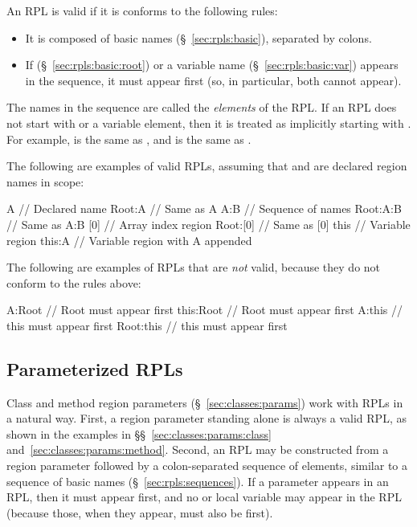 An RPL is valid if it is conforms to the following rules:
%
\begin{itemize}
%
\item It is composed of basic names (\S~\ref{sec:rpls:basic}),
  separated by colons.
%
\item If  (\S~\ref{sec:rpls:basic:root}) or a variable name
  (\S~\ref{sec:rpls:basic:var}) appears in the sequence, it must
  appear first (so, in particular, both cannot appear).
%
\end{itemize}
%
The names in the sequence are called the \emph{elements} of the RPL.
If an RPL does not start with  or a variable element, then
it is treated as implicitly starting with .  For example,
 is the same as , and \kwd{[0]} is the same as
.

The following are examples of valid RPLs, assuming that  and
 are declared region names in scope:
%
\begin{dpjlisting}
A        // Declared name
Root:A   // Same as A
A:B      // Sequence of names
Root:A:B // Same as A:B
[0]      // Array index region
Root:[0] // Same as [0]
this     // Variable region
this:A   // Variable region with A appended
\end{dpjlisting}

The following are examples of RPLs that are \emph{not} valid, because
they do not conform to the rules above:
%
\begin{dpjlisting}
A:Root    // Root must appear first
this:Root // Root must appear first
A:this    // this must appear first
Root:this // this must appear first
\end{dpjlisting}

\subsection{Parameterized RPLs%
\label{sec:rpls:param}}

Class and method region parameters (\S~\ref{sec:classes:params}) work
with RPLs in a natural way.  First, a region parameter standing alone
is always a valid RPL, as shown in the examples in
\S\S~\ref{sec:classes:params:class}
and~\ref{sec:classes:params:method}.  Second, an RPL may be
constructed from a region parameter followed by a colon-separated
sequence of elements, similar to a sequence of basic names
(\S~\ref{sec:rpls:sequences}).  If a parameter appears in an RPL, then
it must appear first, and no  or  local variable
may appear in the RPL (because those, when they appear, must also be
first).

